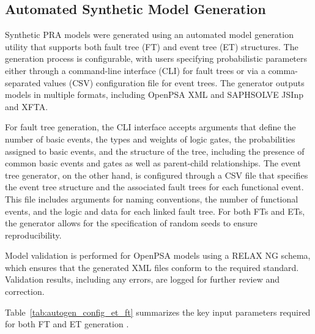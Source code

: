 \subsection{Automated Synthetic Model Generation}

Synthetic PRA models were generated using an automated model generation utility that supports both fault tree (FT) and event tree (ET) structures. The generation process is configurable, with users specifying probabilistic parameters either through a command-line interface (CLI) for fault trees or via a comma-separated values (CSV) configuration file for event trees. The generator outputs models in multiple formats, including OpenPSA XML and SAPHSOLVE JSInp and XFTA.

For fault tree generation, the CLI interface accepts arguments that define the number of basic events, the types and weights of logic gates, the probabilities assigned to basic events, and the structure of the tree, including the presence of common basic events and gates as well as parent-child relationships. The event tree generator, on the other hand, is configured through a CSV file that specifies the event tree structure and the associated fault trees for each functional event. This file includes arguments for naming conventions, the number of functional events, and the logic and data for each linked fault tree. For both FTs and ETs, the generator allows for the specification of random seeds to ensure reproducibility.

Model validation is performed for OpenPSA models using a RELAX NG schema, which ensures that the generated XML files conform to the required standard. Validation results, including any errors, are logged for further review and correction.

Table~\ref{tab:autogen_config_et_ft} summarizes the key input parameters required for both FT and ET generation \cite{Farag2023Benchmarking}.


